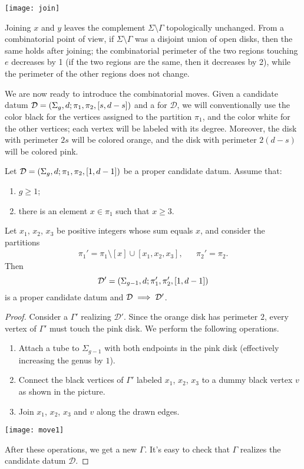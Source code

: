 \documentclass{article}
\begin{document}
\begin{center}
\texttt{[image: join]}
\end{center}

Joining $x$ and $y$ leaves the complement $\Sigma\setminus\Gamma$ topologically unchanged. From a combinatorial point of view, if $\Sigma\setminus\Gamma$ was a disjoint union of open disks, then the same holds after joining; the combinatorial perimeter of the two regions touching $e$ decreases by 1 (if the two regions are the same, then it decreases by 2), while the perimeter of the other regions does not change.

We are now ready to introduce the combinatorial moves. Given a candidate datum $\mathcal{D}=\left(\Sigma_g,d;\pi_1,\pi_2,[s,d-s]\right)$ and a \dessin{} for $\mathcal{D}$, we will conventionally use the color black for the vertices assigned to the partition $\pi_1$, and the color white for the other vertices; each vertex will be labeled with its degree. Moreover, the disk with perimeter $2s$ will be colored orange, and the disk with perimeter $2(d-s)$ will be colored pink.

\begin{combinatorialmove}\label{move:s1-3}
Let $\mathcal{D}=\left(\Sigma_g,d;\pi_1,\pi_2,[1,d-1]\right)$ be a proper candidate datum. Assume that:
\begin{enumerate}
\item $g\ge 1$;
\item there is an element $x\in\pi_1$ such that $x\ge 3$.
\end{enumerate}
Let $x_1$, $x_2$, $x_3$ be positive integers whose sum equals $x$, and consider the partitions
\begin{align*}
\pi_1'=\pi_1\setminus[x]\cup[x_1,x_2,x_3],&&\pi_2'=\pi_2.
\end{align*}
Then
\[
\mathcal{D'}=\left(\Sigma_{g-1},d;\pi_1',\pi_2',[1,d-1]\right)
\]
is a proper candidate datum and $\mathcal{D}\implies\mathcal{D}'$.
\end{combinatorialmove}
\begin{proof}
Consider a \dessin{} $\Gamma'$ realizing $\mathcal{D}'$. Since the orange disk has perimeter $2$, every vertex of $\Gamma'$ must touch the pink disk. We perform the following operations.
\begin{enumerate}
\item Attach a tube to $\Sigma_{g-1}$ with both endpoints in the pink disk (effectively increasing the genus by $1$).
\item Connect the black vertices of $\Gamma'$ labeled $x_1$, $x_2$, $x_3$ to a dummy black vertex $v$ as shown in the picture.
\item Join $x_1$, $x_2$, $x_3$ and $v$ along the drawn edges.
\end{enumerate}
\begin{center}
\texttt{[image: move1]}
\end{center}
After these operations, we get a new \dessin{} $\Gamma$. It's easy to check that $\Gamma$ realizes the candidate datum $\mathcal{D}$.
\end{proof}
\end{document}
